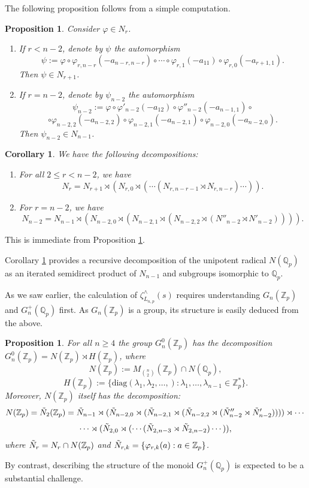 \documentclass[12pt]{article}
\newtheorem{proposition2}[theorem2]{Proposition}
\newtheorem{corollary2}[theorem2]{Corollary}
\begin{document}
The following proposition follows from a simple computation.
\begin{proposition2}
\label{prop:psi.automorphism}
Consider $\varphi\in{N_{r}}$.
\begin{enumerate}
    \item 
If $r<n-2$, denote by $\psi$ the automorphism \[\psi:=\varphi\circ\varphi_{r,n-r}(-a_{n-r,n-r})\circ\cdots\circ\varphi_{r,1}(-a_{11})\circ\varphi_{r,0}(-a_{r+1,1}).\]
Then $\psi\in{N_{r+1}}$.
    \item 
If $r=n-2$, denote by $\psi_{n-2}$ the automorphism \[\psi_{n-2}:=\varphi\circ\varphi'_{n-2}(-a_{12})\circ\varphi''_{n-2}(-a_{n-1,1})\circ\]\[\circ\varphi_{n-2,2}(-a_{n-2,2})\circ\varphi_{n-2,1}(-a_{n-2,1})\circ\varphi_{n-2,0}(-a_{n-2,0}).\]
Then $\psi_{n-2}\in{N_{n-1}}$.
\end{enumerate}
\end{proposition2}
\begin{corollary2}
\label{cor:Nr.decomposition}
We have the following decompositions:
\begin{enumerate}
    \item 
For all $2\leq{r}<{n-2}$, we have \[N_{r}=N_{r+1}\rtimes(N_{r,0}\rtimes(\cdots(N_{r,n-r-1}\rtimes{N_{r,n-r}})\cdots)).\]
\item For $r=n-2$, we have 
\[N_{n-2}=N_{n-1}\rtimes({N_{n-2,0}}\rtimes(N_{n-2,1}\rtimes(N_{n-2,2}\rtimes(N''_{n-2}\rtimes{N'_{n-2}})))).\]
\end{enumerate}
\end{corollary2}
This is immediate from Proposition \ref{prop:psi.automorphism}.

Corollary \ref{cor:Nr.decomposition} provides a recursive decomposition of the unipotent radical $N(\mathbb{Q}_{p})$ as an iterated semidirect product of $N_{n-1}$ and subgroups isomorphic to $\mathbb{Q}_{p}$.

As we saw earlier, the calculation of $\zeta_{L_{n,p}}^{\wedge}(s)$ requires understanding $G_{n}(\mathbb{Z}_p)$ and $G_{n}^{+}(\mathbb{Q}_p)$ first. As $G_{n}(\mathbb{Z}_{p})$ is a group, its structure is easily deduced from the above.
\begin{proposition2}
\label{prop:G.n.Zp.decomposition}
For all $n\geq{4}$ the group $G_{n}^{0}(\mathbb{Z}_{p})$ has the decomposition $G_{n}^{0}(\mathbb{Z}_{p})=N(\mathbb{Z}_{p})\rtimes{H(\mathbb{Z}_{p})}$, where \[N(\mathbb{Z}_{p}):=M_{\binom{n}{2}}(\mathbb{Z}_{p})\cap{N(\mathbb{Q}_{p})},\]
\[H(\mathbb{Z}_{p}):=\{\mathrm{diag}(\lambda_{1},\lambda_{2},\dots,) : \lambda_1,\dots,\lambda_{n-1}\in\mathbb{Z}_{p}^{\ast}\}.\]
Moreover, $N(\mathbb{Z}_{p})$ itself has the decomposition: \[N(\mathbb{Z}_{p})=\Tilde{N}_{2}(\mathbb{Z}_{p})=
\Tilde{N}_{n-1}\rtimes({\Tilde{N}_{n-2,0}}\rtimes(\Tilde{N}_{n-2,1}\rtimes(\Tilde{N}_{n-2,2}\rtimes(\Tilde{N}''_{n-2}\rtimes{\Tilde{N}'_{n-2}}))))\rtimes\cdots\]\[\cdots\rtimes{(\Tilde{N}_{2,0}\rtimes(\cdots(\Tilde{N}_{2,n-3}\rtimes{\Tilde{N}_{2,n-2}})\cdots))}
,\]
where $\Tilde{N}_{r}=N_{r}\cap{N(\mathbb{Z}_{p})}$ and $\Tilde{N}_{r,k}=\{\varphi_{r,k}(a) : a\in\mathbb{Z}_{p}\}$.
\end{proposition2}
By contrast, describing the structure of the monoid $G_{n}^{+}(\mathbb{Q}_p)$ is expected to be a substantial challenge.
\end{document}
